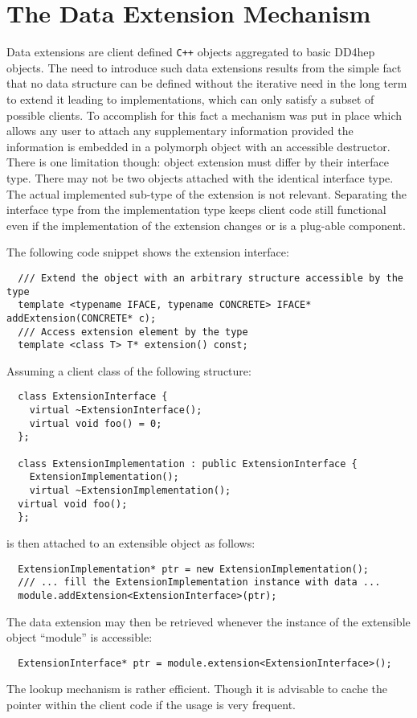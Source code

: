 \section{The Data Extension Mechanism}
\label{sec:dd4hep-user-manual-data-extensions}

Data extensions are client defined \texttt{C++} objects aggregated to basic DD4hep objects. The need to introduce such data extensions results from the simple fact that no data structure can be defined without the iterative need in the long term to extend it leading to implementations, which can only satisfy a subset of possible clients. To accomplish for this fact a mechanism was put in place which allows any user to attach any supplementary information provided the information is embedded in a polymorph object with an accessible destructor. There is one limitation though: object extension must differ by their interface type. There may not be two objects attached with the identical interface type. The actual implemented sub-type of the extension is not relevant. Separating the interface type from the implementation type keeps client code still functional even if the implementation of the extension changes 
or is a plug-able component.

The following code snippet shows the extension interface:

\begin{verbatim}
  /// Extend the object with an arbitrary structure accessible by the type
  template <typename IFACE, typename CONCRETE> IFACE* addExtension(CONCRETE* c);
  /// Access extension element by the type
  template <class T> T* extension() const;
\end{verbatim}

Assuming a client class of the following structure:
\begin{verbatim}
  class ExtensionInterface {
    virtual ~ExtensionInterface();
    virtual void foo() = 0;
  };

  class ExtensionImplementation : public ExtensionInterface {
    ExtensionImplementation();
    virtual ~ExtensionImplementation();
  virtual void foo();
  };
\end{verbatim}
is then attached to an extensible object as follows:
\begin{verbatim}
  ExtensionImplementation* ptr = new ExtensionImplementation();
  /// ... fill the ExtensionImplementation instance with data ...
  module.addExtension<ExtensionInterface>(ptr);
\end{verbatim}
The data extension may then be retrieved whenever the instance of the extensible object ``module'' is accessible:
\begin{verbatim}
  ExtensionInterface* ptr = module.extension<ExtensionInterface>();
\end{verbatim}
The lookup mechanism is rather efficient. Though it is advisable to cache the pointer within the client code if the usage is very frequent.

